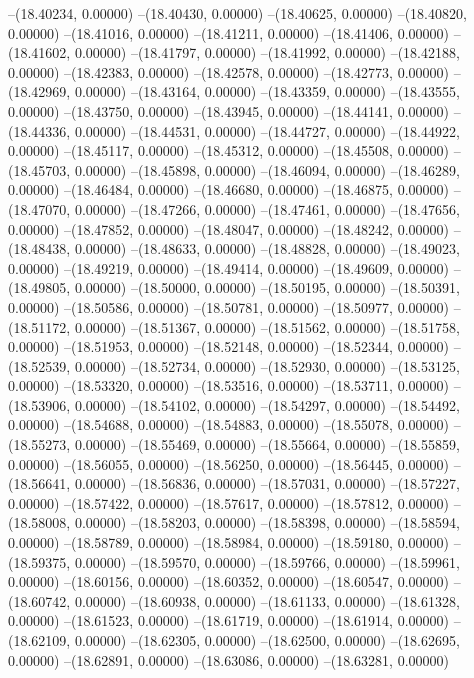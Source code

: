 --(18.40234, 0.00000)
--(18.40430, 0.00000)
--(18.40625, 0.00000)
--(18.40820, 0.00000)
--(18.41016, 0.00000)
--(18.41211, 0.00000)
--(18.41406, 0.00000)
--(18.41602, 0.00000)
--(18.41797, 0.00000)
--(18.41992, 0.00000)
--(18.42188, 0.00000)
--(18.42383, 0.00000)
--(18.42578, 0.00000)
--(18.42773, 0.00000)
--(18.42969, 0.00000)
--(18.43164, 0.00000)
--(18.43359, 0.00000)
--(18.43555, 0.00000)
--(18.43750, 0.00000)
--(18.43945, 0.00000)
--(18.44141, 0.00000)
--(18.44336, 0.00000)
--(18.44531, 0.00000)
--(18.44727, 0.00000)
--(18.44922, 0.00000)
--(18.45117, 0.00000)
--(18.45312, 0.00000)
--(18.45508, 0.00000)
--(18.45703, 0.00000)
--(18.45898, 0.00000)
--(18.46094, 0.00000)
--(18.46289, 0.00000)
--(18.46484, 0.00000)
--(18.46680, 0.00000)
--(18.46875, 0.00000)
--(18.47070, 0.00000)
--(18.47266, 0.00000)
--(18.47461, 0.00000)
--(18.47656, 0.00000)
--(18.47852, 0.00000)
--(18.48047, 0.00000)
--(18.48242, 0.00000)
--(18.48438, 0.00000)
--(18.48633, 0.00000)
--(18.48828, 0.00000)
--(18.49023, 0.00000)
--(18.49219, 0.00000)
--(18.49414, 0.00000)
--(18.49609, 0.00000)
--(18.49805, 0.00000)
--(18.50000, 0.00000)
--(18.50195, 0.00000)
--(18.50391, 0.00000)
--(18.50586, 0.00000)
--(18.50781, 0.00000)
--(18.50977, 0.00000)
--(18.51172, 0.00000)
--(18.51367, 0.00000)
--(18.51562, 0.00000)
--(18.51758, 0.00000)
--(18.51953, 0.00000)
--(18.52148, 0.00000)
--(18.52344, 0.00000)
--(18.52539, 0.00000)
--(18.52734, 0.00000)
--(18.52930, 0.00000)
--(18.53125, 0.00000)
--(18.53320, 0.00000)
--(18.53516, 0.00000)
--(18.53711, 0.00000)
--(18.53906, 0.00000)
--(18.54102, 0.00000)
--(18.54297, 0.00000)
--(18.54492, 0.00000)
--(18.54688, 0.00000)
--(18.54883, 0.00000)
--(18.55078, 0.00000)
--(18.55273, 0.00000)
--(18.55469, 0.00000)
--(18.55664, 0.00000)
--(18.55859, 0.00000)
--(18.56055, 0.00000)
--(18.56250, 0.00000)
--(18.56445, 0.00000)
--(18.56641, 0.00000)
--(18.56836, 0.00000)
--(18.57031, 0.00000)
--(18.57227, 0.00000)
--(18.57422, 0.00000)
--(18.57617, 0.00000)
--(18.57812, 0.00000)
--(18.58008, 0.00000)
--(18.58203, 0.00000)
--(18.58398, 0.00000)
--(18.58594, 0.00000)
--(18.58789, 0.00000)
--(18.58984, 0.00000)
--(18.59180, 0.00000)
--(18.59375, 0.00000)
--(18.59570, 0.00000)
--(18.59766, 0.00000)
--(18.59961, 0.00000)
--(18.60156, 0.00000)
--(18.60352, 0.00000)
--(18.60547, 0.00000)
--(18.60742, 0.00000)
--(18.60938, 0.00000)
--(18.61133, 0.00000)
--(18.61328, 0.00000)
--(18.61523, 0.00000)
--(18.61719, 0.00000)
--(18.61914, 0.00000)
--(18.62109, 0.00000)
--(18.62305, 0.00000)
--(18.62500, 0.00000)
--(18.62695, 0.00000)
--(18.62891, 0.00000)
--(18.63086, 0.00000)
--(18.63281, 0.00000)
